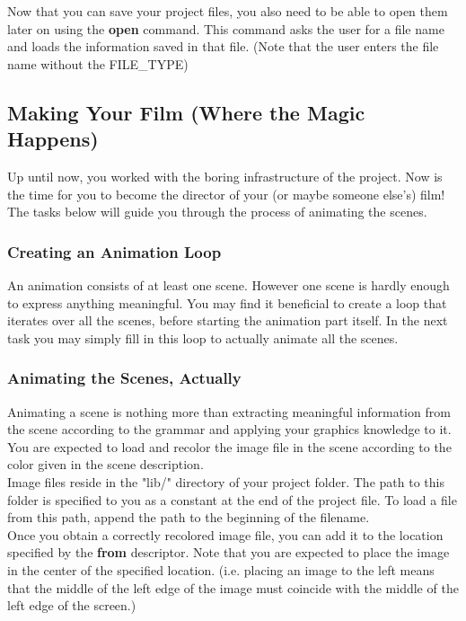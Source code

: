 \documentclass[a4paper]{article}
\begin{document}
	Now that you can save your project files, you also need to be able to open them later on using the \textbf{open} command. This command asks the user for a file name and loads the information saved in that file. (Note that the user enters the file name without the FILE\_TYPE)
	
	\subsection{Making Your Film (Where the Magic Happens)}
	Up until now, you worked with the boring infrastructure of the project. Now is the time for you to become the director of your (or maybe someone else's) film! The tasks below will guide you through the process of animating the scenes.
 	
	\subsubsection{Creating an Animation Loop}
	An animation consists of at least one scene. However one scene is hardly enough to express anything meaningful. You may find it beneficial to create a loop that iterates over all the scenes, before starting the animation part itself. In the next task you may simply fill in this loop to actually animate all the scenes.
	
	\subsubsection{Animating the Scenes, Actually}
	Animating a scene is nothing more than extracting meaningful information from the scene according to the grammar and applying your graphics knowledge to it. You are expected to load and recolor the image file in the scene according to the color given in the scene description.\\
	
	Image files reside in the "lib/" directory of your project folder. The path to this folder is specified to you as a constant at the end of the project file. To load a file from this path, append the path to the beginning of the filename. \\
	
	Once you obtain a correctly recolored image file, you can add it to the location specified by the \textbf{from} descriptor. Note that you are expected to place the image in the center of the specified location. (i.e. placing an image to the left means that the middle of the left edge of the image must coincide with the middle of the left edge of the screen.)\\
	
\end{document}
